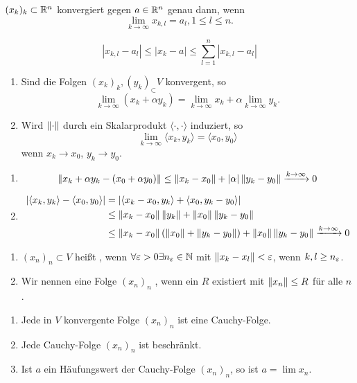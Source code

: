 \begin{lemma}
	$ (x_k)_k\subset\mathbb{R}^n $ konvergiert gegen $ a\in\mathbb{R}^n $ genau dann, wenn
	\[ \lim_{k\to\infty} x_{k,l}=a_l, 1\leq l\leq n. \]
\end{lemma}
\begin{beweis}
	\[ |x_{k,l}-a_l|\leq |x_k-a|\leq\sum_{l=1}^{n}|x_{k,l}-a_l| \]
\end{beweis}
\begin{lemma}
	\bullshit
	\begin{enumerate}
		\item Sind die Folgen $ (x_k)_k, (y_k)_\subset V $ konvergent, so
		\[ \lim_{k\to\infty}(x_k+\alpha y_k)=\lim_{k\to\infty} x_k+\alpha\lim_{k\to\infty}y_k. \]
		\item Wird $ \left\|\cdot\right\| $ durch ein Skalarprodukt $ \langle\cdot,\cdot\rangle $ induziert, so
		\[ \lim_{k\to\infty}\langle x_k,y_k\rangle=\langle x_0,y_0\rangle \]
		wenn $ x_k\to x_0 $, $ y_k\to y_0 $.
	\end{enumerate}
\end{lemma}
\begin{beweis}
	\begin{enumerate}
		\item \[ \left\|x_k+\alpha y_k-(x_0+\alpha y_0)\right\|\leq\left\|x_k-x_0\right\|+|\alpha|\left\|y_k-y_0\right\|\xrightarrow{k\to\infty}0 \]
		\item \begin{align*} |\langle x_k,y_k\rangle-\langle x_0,y_0\rangle|&=|\langle x_k-x_0,y_k\rangle+\langle x_0,y_k-y_0\rangle|\\&\leq\left\|x_k-x_0\right\|\left\|y_k\right\|+\left\|x_0\right\|\left\|y_k-y_0\right\|\\&\leq\left\|x_k-x_0\right\|(\left\|x_0\right\|+\left\|y_k-y_0\right\|)+\left\|x_0\right\|\left\|y_k-y_0\right\|\xrightarrow{k\to\infty}0
		 \end{align*}
	\end{enumerate}
\end{beweis}
\begin{definition}
	\bullshit
	\begin{enumerate}
		\item 	$ (x_n)_n\subset V $ hei\ss t , wenn $ \forall\varepsilon>0\exists n_\varepsilon\in\mathbb{N} $ mit $ \left\|x_k-x_l\right\|<\varepsilon $, wenn $ k,l\geq n_\varepsilon $.
		\item Wir nennen eine Folge $ (x_n)_n $ , wenn ein $ R $ existiert mit $ \left\|x_n\right\|\leq R $ f\"ur alle $ n $.
	\end{enumerate}
\end{definition}
\begin{lemma}
	\bullshit
	\begin{enumerate}
		\item Jede in $ V $ konvergente Folge $ (x_n)_n $ ist eine Cauchy-Folge.
		\item Jede Cauchy-Folge $ (x_n)_n $ ist beschr\"ankt.
		\item Ist $ a $ ein H\"aufungswert der Cauchy-Folge $ (x_n)_n $, so ist $ a=\lim x_n $.
	\end{enumerate}
\end{lemma}
